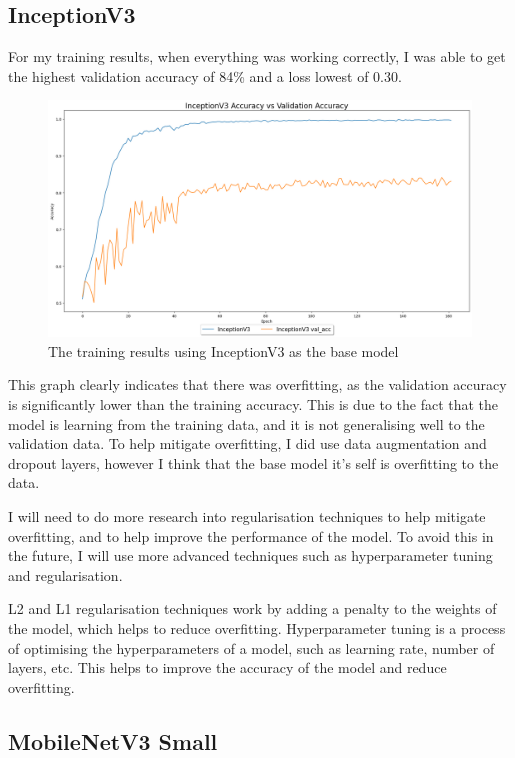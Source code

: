 \documentclass[]{final_report}
\begin{document}
\subsection{InceptionV3}
For my training results, when everything was working correctly, I was able to get the highest validation accuracy of 84\% and a loss lowest of 0.30.
\begin{figure}[ht!]
  \centering
  \includegraphics[width=120mm]{images/inceptionv3-accuracy-vs-val-acc.png}
  \caption{The training results using InceptionV3\cite{DBLP:journals/corr/SzegedyVISW15} as the base model}
\end{figure}

This graph clearly indicates that there was overfitting, as the validation accuracy is significantly lower than the training accuracy.
This is due to the fact that the model is learning from the training data, and it is not generalising well to the validation data.
To help mitigate overfitting, I did use data augmentation and dropout layers, however I think that the base model it's self is overfitting to the data.

I will need to do more research into regularisation techniques to help mitigate overfitting, and to help improve the performance of the model.
To avoid this in the future, I will use more advanced techniques such as hyperparameter tuning and regularisation.

L2 and L1 regularisation techniques work by adding a penalty to the weights of the model, which helps to reduce overfitting.
Hyperparameter tuning is a process of optimising the hyperparameters of a model, such as learning rate, number of layers, etc. 
This helps to improve the accuracy of the model and reduce overfitting.
\pagebreak

\subsection{MobileNetV3 Small}
\end{document}

